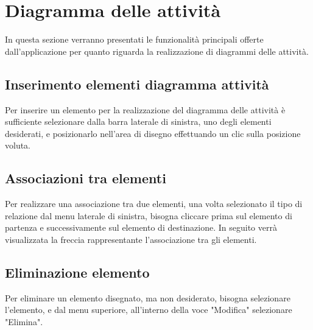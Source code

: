 \section{Diagramma delle attività}
In questa sezione verranno presentati le funzionalità principali offerte dall'applicazione per quanto riguarda la realizzazione di diagrammi delle attività.

\subsection{Inserimento elementi diagramma attività}
Per inserire un elemento per la realizzazione del diagramma delle attività è sufficiente selezionare dalla barra laterale di sinistra, uno degli elementi desiderati, e posizionarlo nell'area di disegno effettuando un clic sulla posizione voluta.

\subsection{Associazioni tra elementi}
Per realizzare una associazione tra due elementi, una volta selezionato il tipo di relazione dal menu laterale di sinistra, bisogna cliccare prima sul elemento di partenza e successivamente sul elemento di destinazione. In seguito verrà visualizzata la freccia rappresentante l'associazione tra gli elementi.

\subsection{Eliminazione elemento}
Per eliminare un elemento disegnato, ma non desiderato, bisogna selezionare l'elemento, e dal menu superiore, all'interno della voce "Modifica" selezionare "Elimina".